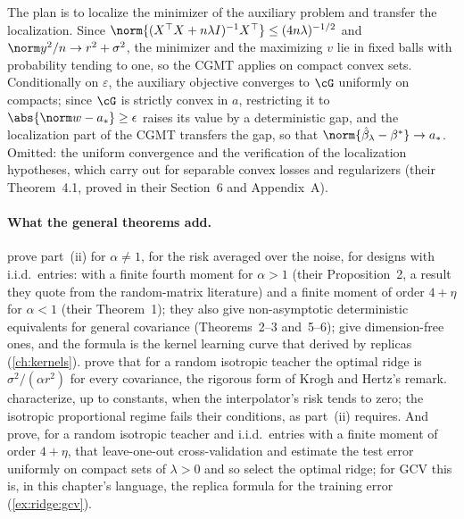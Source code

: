 \begin{refsection}
\begin{proofsketch}
The plan is to localize the minimizer of the auxiliary problem and transfer the localization. Since $\norm{(X^\top X+n\lambda I)^{-1}X^\top}\le(4n\lambda)^{-1/2}$ and $\norm y^2/n\to r^2+\sigma^2$, the minimizer and the maximizing $v$ lie in fixed balls with probability tending to one, so the CGMT applies on compact convex sets. Conditionally on $\varepsilon$, the auxiliary objective converges to $\cG$ uniformly on compacts; since $\cG$ is strictly convex in $a$, restricting it to $\abs{\norm w-a_*}\ge\epsilon$ raises its value by a deterministic gap, and the localization part of the CGMT \parencite[Theorem~6.1(iii)]{ThrampoulidisAbbasiHassibi2018} transfers the gap, so that $\norm{\hat\beta_\lambda-\beta^*}\to a_*$. Omitted: the uniform convergence and the verification of the localization hypotheses, which \textcite{ThrampoulidisAbbasiHassibi2018} carry out for separable convex losses and regularizers (their Theorem~4.1, proved in their Section~6 and Appendix~A).
\end{proofsketch}

\paragraph{What the general theorems add.} \textcite{HastieEtAl2022} prove part~(ii) for $\alpha\ne1$, for the risk averaged over the noise, for designs with i.i.d.\ entries: with a finite fourth moment for $\alpha>1$ (their Proposition~2, a result they quote from the random-matrix literature) and a finite moment of order $4+\eta$ for $\alpha<1$ (their Theorem~1); they also give non-asymptotic deterministic equivalents for general covariance (Theorems~2--3 and~5--6); \textcite{ChengMontanari2024} give dimension-free ones, and the formula is the kernel learning curve that \textcite{CanatarEtAl2021} derived by replicas (\cref{ch:kernels}). \textcite[Theorem~2.1]{DobribanWager2018} prove that for a random isotropic teacher the optimal ridge is $\sigma^2/(\alpha r^2)$ for every covariance, the rigorous form of Krogh and Hertz's remark. \textcite[Theorems~1 and~2]{BartlettEtAl2020} characterize, up to constants, when the interpolator's risk tends to zero; the isotropic proportional regime fails their conditions, as part~(ii) requires. And \textcite[Theorem~7]{HastieEtAl2022} prove, for a random isotropic teacher and i.i.d.\ entries with a finite moment of order $4+\eta$, that leave-one-out cross-validation and  \parencite{GolubHeathWahba1979} estimate the test error uniformly on compact sets of $\lambda>0$ and so select the optimal ridge; for GCV this is, in this chapter's language, the replica formula for the training error (\cref{ex:ridge:gcv}).


\end{refsection}
